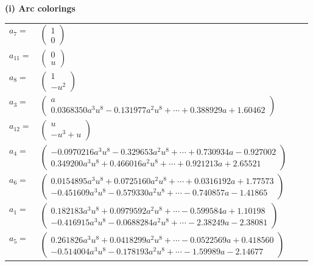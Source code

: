 \documentclass[1p]{elsarticle_modified}
\theoremstyle{definition}
\begin{document}
\flushleft \textbf{(i) Arc colorings}\\
\begin{tabular}{m{7pt} m{180pt} m{7pt} m{180pt} }
\flushright $a_{7}=$&$\begin{pmatrix}1\\0\end{pmatrix}$ \\
\flushright $a_{11}=$&$\begin{pmatrix}0\\u\end{pmatrix}$ \\
\flushright $a_{8}=$&$\begin{pmatrix}1\\- u^2\end{pmatrix}$ \\
\flushright $a_{3}=$&$\begin{pmatrix}a\\0.0368350 a^{3} u^{8}-0.131977 a^{2} u^{8}+\cdots+0.388929 a+1.60462\end{pmatrix}$ \\
\flushright $a_{12}=$&$\begin{pmatrix}u\\- u^3+u\end{pmatrix}$ \\
\flushright $a_{4}=$&$\begin{pmatrix}-0.0970216 a^{3} u^{8}-0.329653 a^{2} u^{8}+\cdots+0.730934 a-0.927002\\0.349200 a^{3} u^{8}+0.466016 a^{2} u^{8}+\cdots+0.921213 a+2.65521\end{pmatrix}$ \\
\flushright $a_{6}=$&$\begin{pmatrix}0.0154895 a^{3} u^{8}+0.0725160 a^{2} u^{8}+\cdots+0.0316192 a+1.77573\\-0.451609 a^{3} u^{8}-0.579330 a^{2} u^{8}+\cdots-0.740857 a-1.41865\end{pmatrix}$ \\
\flushright $a_{1}=$&$\begin{pmatrix}0.182183 a^{3} u^{8}+0.0979592 a^{2} u^{8}+\cdots-0.599584 a+1.10198\\-0.416915 a^{3} u^{8}-0.0688284 a^{2} u^{8}+\cdots-2.38249 a-2.38081\end{pmatrix}$ \\
\flushright $a_{5}=$&$\begin{pmatrix}0.261826 a^{3} u^{8}+0.0418299 a^{2} u^{8}+\cdots-0.0522569 a+0.418560\\-0.514004 a^{3} u^{8}-0.178193 a^{2} u^{8}+\cdots-1.59989 a-2.14677\end{pmatrix}$ \\

\end{tabular}
\end{document}
